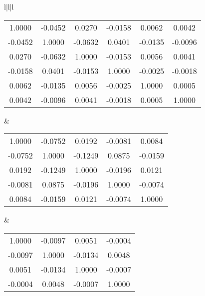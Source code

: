 \begin{deluxetable*}{l|l|l}
\tabletypesize{\footnotesize}
\tablewidth{0pt} 
\startdata
\begin{tabular}{cccccc}
 1.0000  & -0.0452  &  0.0270  & -0.0158  &  0.0062  &  0.0042  \\
-0.0452  &  1.0000  & -0.0632  &  0.0401  & -0.0135  & -0.0096  \\
 0.0270  & -0.0632  &  1.0000  & -0.0153  &  0.0056  &  0.0041  \\
-0.0158  &  0.0401  & -0.0153  &  1.0000  & -0.0025  & -0.0018  \\
 0.0062  & -0.0135  &  0.0056  & -0.0025  &  1.0000  &  0.0005  \\
 0.0042  & -0.0096  &  0.0041  & -0.0018  &  0.0005  &  1.0000  
\end{tabular}
&
\begin{tabular}{ccccc}
 1.0000  & -0.0752  &  0.0192  & -0.0081  &  0.0084  \\
-0.0752  &  1.0000  & -0.1249  &  0.0875  & -0.0159  \\
 0.0192  & -0.1249  &  1.0000  & -0.0196  &  0.0121  \\
-0.0081  &  0.0875  & -0.0196  &  1.0000  & -0.0074  \\
 0.0084  & -0.0159  &  0.0121  & -0.0074  &  1.0000  
\end{tabular}
&
\begin{tabular}{cccc}
 1.0000  & -0.0097  &  0.0051  & -0.0004 \\
-0.0097  &  1.0000  & -0.0134  &  0.0048 \\
 0.0051  & -0.0134  &  1.0000  & -0.0007 \\
-0.0004  &  0.0048  & -0.0007  &  1.0000  
\end{tabular}
 \enddata
\end{deluxetable*}
